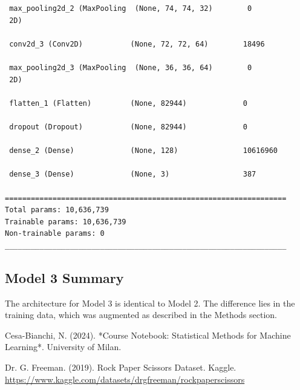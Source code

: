 \documentclass[pdflatex,sn-mathphys-num]{sn-jnl}%
\theoremstyle{thmstyleone}%
\theoremstyle{thmstyletwo}%
\theoremstyle{thmstylethree}%
\begin{document}
\begin{appendices}
\begin{verbatim}
 max_pooling2d_2 (MaxPooling  (None, 74, 74, 32)        0         
 2D)                                                             
                                                                 
 conv2d_3 (Conv2D)           (None, 72, 72, 64)        18496     
                                                                 
 max_pooling2d_3 (MaxPooling  (None, 36, 36, 64)        0         
 2D)                                                             
                                                                 
 flatten_1 (Flatten)         (None, 82944)             0         
                                                                 
 dropout (Dropout)           (None, 82944)             0         
                                                                 
 dense_2 (Dense)             (None, 128)               10616960  
                                                                 
 dense_3 (Dense)             (None, 3)                 387       
                                                                 
=================================================================
Total params: 10,636,739
Trainable params: 10,636,739
Non-trainable params: 0
_________________________________________________________________
\end{verbatim}

\subsection{Model 3 Summary}
The architecture for Model 3 is identical to Model 2. The difference lies in the training data, which was augmented as described in the Methods section.

\end{appendices}


\begin{thebibliography}{9}

Cesa-Bianchi, N. (2024). *Course Notebook: Statistical Methods for Machine Learning*. University of Milan.

Dr. G. Freeman. (2019). Rock Paper Scissors Dataset. Kaggle. \url{https://www.kaggle.com/datasets/drgfreeman/rockpaperscissors}

\end{thebibliography}
\end{document}

